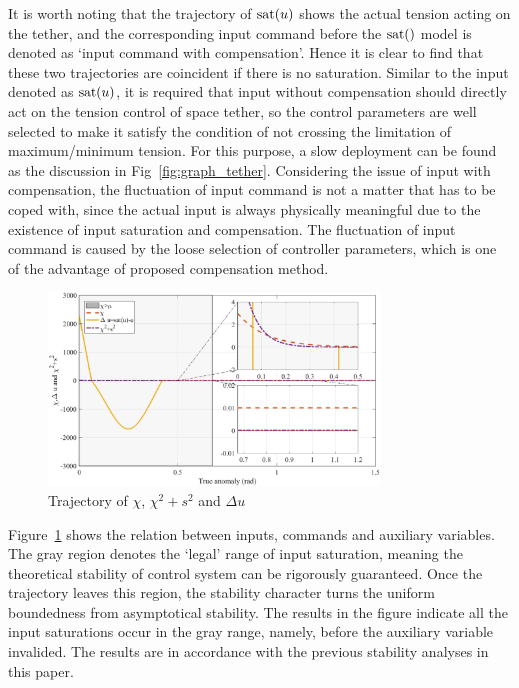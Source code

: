 \documentclass[10pt,final,journal]{IEEEtran}
\begin{document}
It is worth noting that the trajectory of ${\rm sat}(u)$ shows the actual tension acting on the tether, and the corresponding input command before the ${\rm sat}()$ model is denoted as `input command with compensation'. Hence it is clear to find that these two trajectories are coincident if there is no saturation. Similar to the input denoted as  ${\rm sat}(u)$, it is required that input without compensation should directly act on the tension control of space tether, so the control parameters are well selected to make it satisfy the condition of not crossing the limitation of maximum/minimum tension. For this purpose, a slow deployment can be found as the discussion in Fig~\ref{fig:graph_tether}. Considering the issue of input with compensation, the fluctuation of input command is not a matter that has to be coped with, since the actual input is always physically meaningful due to the existence of input saturation and compensation. The fluctuation of input command is caused by the loose selection of controller parameters, which is one of the advantage of proposed compensation method.
\begin{figure}[htbp]  
	\centering
\includegraphics[width=250pt]{chi.eps}
\caption{Trajectory of $\chi$, $\chi^2+s^2$ and $\Delta u$} \label{fig:graph_chi}
\end{figure} 

Figure~\ref{fig:graph_chi} shows the relation between inputs, commands and auxiliary variables. The gray region denotes the `legal' range of input saturation, meaning the theoretical stability of control system can be rigorously guaranteed. Once the trajectory leaves this region, the stability character turns the uniform boundedness from asymptotical stability. The results in the figure indicate all the input saturations occur in the gray range, namely, before the auxiliary variable invalided. The results are in accordance with the previous stability analyses in this paper.  
\end{document}
